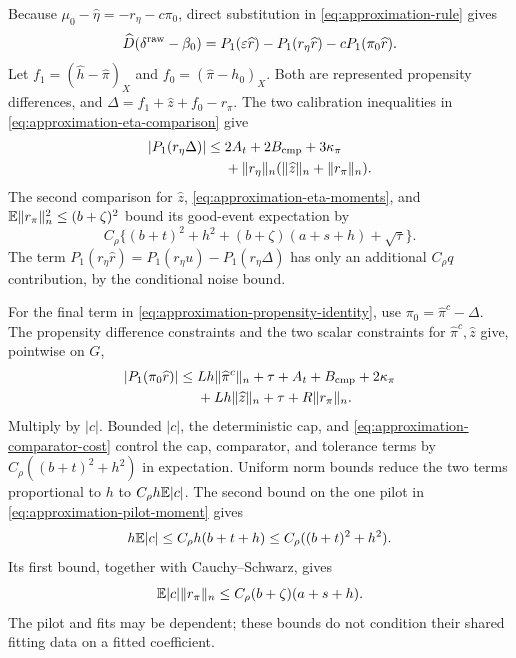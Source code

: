 Because $\mu_0-\widehat\eta=-r_\eta-c\pi_0$, direct substitution
in \eqref{eq:approximation-rule} gives
\begin{equation}
 \widehat D(\delta^{\rm raw}-\beta_0)
 =P_1(\varepsilon\widehat r)-P_1(r_\eta\widehat r)
       -cP_1(\pi_0\widehat r).
 \label{eq:approximation-propensity-identity}
\end{equation}
Let $f_1=(\widehat h-\widehat\pi)_X$ and
$f_0=(\widehat\pi-h_0)_X$. Both are represented propensity
differences, and
$\Delta=f_1+\widehat z+f_0-r_\pi$. The two calibration
inequalities in \eqref{eq:approximation-eta-comparison} give
\begin{equation}
 \begin{split}
 |P_1(r_\eta\Delta)|
 \le{}&2A_t+2B_{\rm cmp}+3\kappa_\pi\\
 &+\|r_\eta\|_n(\|\widehat z\|_n+\|r_\pi\|_n).
 \end{split}
 \label{eq:approximation-remainder-calibration}
\end{equation}
The second comparison for $\widehat z$,
\eqref{eq:approximation-eta-moments}, and
$\mathbb E\|r_\pi\|_n^2\le(b+\zeta)^2$ bound its good-event
expectation by
\begin{equation}
 C_\rho\{(b+t)^2+h^2+(b+\zeta)(a+s+h)+\sqrt\tau\}.
 \label{eq:approximation-remainder-bound}
\end{equation}
The term $P_1(r_\eta\widehat r)
=P_1(r_\eta u)-P_1(r_\eta\Delta)$ has only an additional
$C_\rho q$ contribution, by the conditional noise bound.

For the final term in
\eqref{eq:approximation-propensity-identity}, use
$\pi_0=\widehat\pi^c-\Delta$. The propensity difference
constraints and the two scalar constraints for
$\widehat\pi^c,\widehat z$ give, pointwise on $G$,
\begin{equation}
 \begin{split}
 |P_1(\pi_0\widehat r)|
 \le{}&Lh\|\widehat\pi^c\|_n+\tau
       +A_t+B_{\rm cmp}+2\kappa_\pi\\
 &+Lh\|\widehat z\|_n+\tau+R\|r_\pi\|_n.
 \end{split}
 \label{eq:approximation-self-calibration}
\end{equation}
Multiply by $|c|$. Bounded $|c|$, the deterministic cap, and
\eqref{eq:approximation-comparator-cost} control the cap, comparator,
and tolerance terms by $C_\rho((b+t)^2+h^2)$ in expectation.
Uniform norm bounds reduce the two terms proportional to $h$ to
$C_\rho h\mathbb E|c|$. The second bound on the one pilot in
\eqref{eq:approximation-pilot-moment} gives
\begin{equation}
 h\mathbb E|c|\le C_\rho h(b+t+h)
 \le C_\rho((b+t)^2+h^2).
 \label{eq:approximation-pilot-use-propensity}
\end{equation}
Its first bound, together with Cauchy--Schwarz, gives
\begin{equation}
 \mathbb E|c|\|r_\pi\|_n
 \le C_\rho(b+\zeta)(a+s+h).
 \label{eq:approximation-pilot-use-outcome}
\end{equation}
The pilot and fits may be dependent; these bounds do not condition
their shared fitting data on a fitted coefficient.

